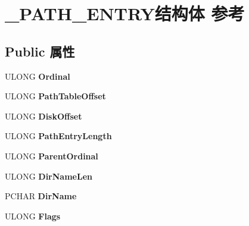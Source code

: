 \hypertarget{struct___p_a_t_h___e_n_t_r_y}{}\section{\+\_\+\+P\+A\+T\+H\+\_\+\+E\+N\+T\+R\+Y结构体 参考}
\label{struct___p_a_t_h___e_n_t_r_y}
\subsection*{Public 属性}
\begin{DoxyCompactItemize}
\item 
\mbox{\label{struct___p_a_t_h___e_n_t_r_y_ad25e81360c60fd1943755bce3cd3df2f}} 
U\+L\+O\+NG {\bfseries Ordinal}
\item 
\mbox{\label{struct___p_a_t_h___e_n_t_r_y_a8b1d9286a19fd10c091987d1a3edd730}} 
U\+L\+O\+NG {\bfseries Path\+Table\+Offset}
\item 
\mbox{\label{struct___p_a_t_h___e_n_t_r_y_a84e3e44ffbe389c0540aa99bdcea9e09}} 
U\+L\+O\+NG {\bfseries Disk\+Offset}
\item 
\mbox{\label{struct___p_a_t_h___e_n_t_r_y_ad1cbdf81a578c40a06fe73614d4e7885}} 
U\+L\+O\+NG {\bfseries Path\+Entry\+Length}
\item 
\mbox{\label{struct___p_a_t_h___e_n_t_r_y_a2adf0cdc866b25768d62d14148004eff}} 
U\+L\+O\+NG {\bfseries Parent\+Ordinal}
\item 
\mbox{\label{struct___p_a_t_h___e_n_t_r_y_aabf8db421e3847abe968846755e7097a}} 
U\+L\+O\+NG {\bfseries Dir\+Name\+Len}
\item 
\mbox{\label{struct___p_a_t_h___e_n_t_r_y_aed875dff1fa4a1afa17b2471952149db}} 
P\+C\+H\+AR {\bfseries Dir\+Name}
\item 
\mbox{\label{struct___p_a_t_h___e_n_t_r_y_ae4dab897479f0c4004a07f6421209bb7}} 
U\+L\+O\+NG {\bfseries Flags}
\item 

\end{DoxyCompactItemize}
